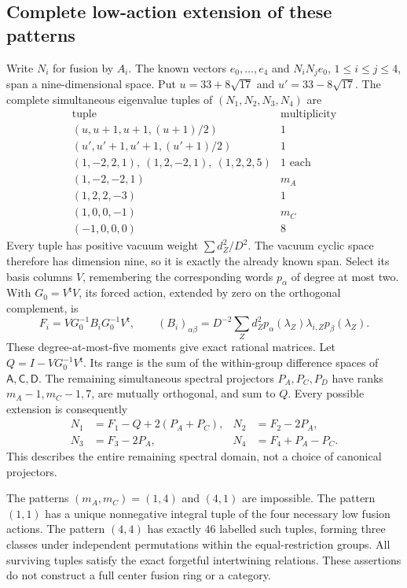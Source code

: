 \subsection{Complete low-action extension of these patterns}

Write $N_i$ for fusion by $A_i$.  The known vectors
$e_0,\ldots,e_4$ and $N_iN_je_0$, $1\le i\le j\le4$, span a
nine-dimensional space.  Put $u=33+8\sqrt{17}$ and
$u'=33-8\sqrt{17}$.  The complete simultaneous eigenvalue tuples of
$(N_1,N_2,N_3,N_4)$ are
\[
\begin{array}{c|c}
\text{tuple}&\text{multiplicity}\\\hline
(u,u+1,u+1,(u+1)/2)&1\\
(u',u'+1,u'+1,(u'+1)/2)&1\\
(1,-2,2,1),\ (1,2,-2,1),\ (1,2,2,5)&1\text{ each}\\
(1,-2,-2,1)&m_A\\
(1,2,2,-3)&1\\
(1,0,0,-1)&m_C\\
(-1,0,0,0)&8
\end{array}
\]
Every tuple has positive vacuum weight $\sum d_Z^2/D^2$.
The vacuum cyclic space therefore has dimension nine, so it is exactly
the already known span.  Select its basis columns $V$, remembering
the corresponding words $p_\alpha$ of degree at most two.  With
$G_0=V^{\mathsf t}V$, its forced action, extended by zero on the
orthogonal complement, is
\[
 F_i=VG_0^{-1}B_iG_0^{-1}V^{\mathsf t},\qquad
 (B_i)_{\alpha\beta}=D^{-2}\sum_Zd_Z^2
 p_\alpha(\lambda_Z)\lambda_{i,Z}p_\beta(\lambda_Z).
\]
These degree-at-most-five moments give exact rational matrices.
Let $Q=I-VG_0^{-1}V^{\mathsf t}$.  Its range is the sum of the
within-group difference spaces of $\mathsf A,\mathsf C,\mathsf D$.
The remaining simultaneous spectral projectors $P_A,P_C,P_D$ have
ranks $m_A-1,m_C-1,7$, are mutually orthogonal, and sum to $Q$.
Every possible extension is consequently
\begin{equation}\label{eq:followup-hidden-actions}
\begin{split}
N_1&=F_1-Q+2(P_A+P_C),&N_2&=F_2-2P_A,\\
N_3&=F_3-2P_A,&N_4&=F_4+P_A-P_C.
\end{split}
\end{equation}
This describes the entire remaining spectral domain, not a choice of
canonical projectors.

\begin{proposition}\label{prop:r721-action-extension}
The patterns $(m_A,m_C)=(1,4)$ and $(4,1)$ are impossible.
The pattern $(1,1)$ has a unique nonnegative integral tuple of the four
necessary low fusion actions.  The pattern $(4,4)$ has exactly $46$
labelled such tuples, forming three classes under independent
permutations within the equal-restriction groups.
All surviving tuples satisfy the exact forgetful intertwining relations.
These assertions do not construct a full center fusion ring or a category.
\end{proposition}

